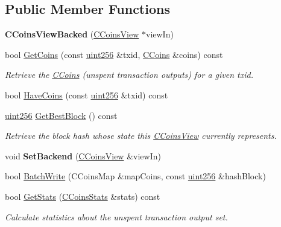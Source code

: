 \subsection*{Public Member Functions}
\begin{DoxyCompactItemize}
\item 
\mbox{\label{class_c_coins_view_backed_af86a3b07433e8d84678772411791125e}} 
{\bfseries C\+Coins\+View\+Backed} (\mbox{\hyperlink{class_c_coins_view}{C\+Coins\+View}} $\ast$view\+In)
\item 
\mbox{\label{class_c_coins_view_backed_a456f9e85817556329a959c120998df5b}} 
bool \mbox{\hyperlink{class_c_coins_view_backed_a456f9e85817556329a959c120998df5b}{Get\+Coins}} (const \mbox{\hyperlink{classuint256}{uint256}} \&txid, \mbox{\hyperlink{class_c_coins}{C\+Coins}} \&coins) const
\begin{DoxyCompactList}\small\item\em Retrieve the \mbox{\hyperlink{class_c_coins}{C\+Coins}} (unspent transaction outputs) for a given txid. \end{DoxyCompactList}\item 
bool \mbox{\hyperlink{class_c_coins_view_backed_ad49041658bdec807d556e080476e6543}{Have\+Coins}} (const \mbox{\hyperlink{classuint256}{uint256}} \&txid) const
\item 
\mbox{\label{class_c_coins_view_backed_a39bca41ae922d0ce7f40e8aeab289280}} 
\mbox{\hyperlink{classuint256}{uint256}} \mbox{\hyperlink{class_c_coins_view_backed_a39bca41ae922d0ce7f40e8aeab289280}{Get\+Best\+Block}} () const
\begin{DoxyCompactList}\small\item\em Retrieve the block hash whose state this \mbox{\hyperlink{class_c_coins_view}{C\+Coins\+View}} currently represents. \end{DoxyCompactList}\item 
\mbox{\label{class_c_coins_view_backed_a7eaddfbfd401a95c2fda2a8d8feaaf73}} 
void {\bfseries Set\+Backend} (\mbox{\hyperlink{class_c_coins_view}{C\+Coins\+View}} \&view\+In)
\item 
bool \mbox{\hyperlink{class_c_coins_view_backed_ace15da3934c9d7a9cb9c7a787f92f764}{Batch\+Write}} (C\+Coins\+Map \&map\+Coins, const \mbox{\hyperlink{classuint256}{uint256}} \&hash\+Block)
\item 
\mbox{\label{class_c_coins_view_backed_aa787da5760afa843d32764b70420b2d6}} 
bool \mbox{\hyperlink{class_c_coins_view_backed_aa787da5760afa843d32764b70420b2d6}{Get\+Stats}} (\mbox{\hyperlink{struct_c_coins_stats}{C\+Coins\+Stats}} \&stats) const
\begin{DoxyCompactList}\small\item\em Calculate statistics about the unspent transaction output set. \end{DoxyCompactList}\end{DoxyCompactItemize}
